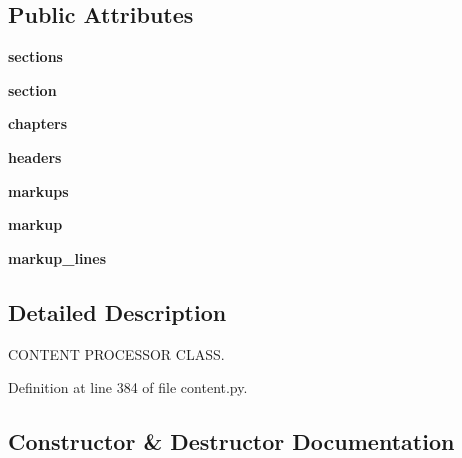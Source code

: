 \subsection*{Public Attributes}
\begin{DoxyCompactItemize}
\item 
\mbox{\label{classcontent_1_1_content_processor_a3ff8c0a86abd7fb9976ae174a7d785f3}} 
{\bfseries sections}
\item 
\mbox{\label{classcontent_1_1_content_processor_a2021840f8ca8c604745a92876a10b027}} 
{\bfseries section}
\item 
\mbox{\label{classcontent_1_1_content_processor_af0f3d9aa503065b3ab016f53d2bad324}} 
{\bfseries chapters}
\item 
\mbox{\label{classcontent_1_1_content_processor_af9febff3c480e3ea067ad35e04f10795}} 
{\bfseries headers}
\item 
\mbox{\label{classcontent_1_1_content_processor_ad9d5d547deff99b362572d8e7029cf96}} 
{\bfseries markups}
\item 
\mbox{\label{classcontent_1_1_content_processor_a4f0dc56a50679457ab079cec4f98a6ef}} 
{\bfseries markup}
\item 
\mbox{\label{classcontent_1_1_content_processor_a08b63a235351bdc84a1a12d565d498c9}} 
{\bfseries markup\+\_\+lines}
\end{DoxyCompactItemize}


\subsection{Detailed Description}
C\+O\+N\+T\+E\+NT P\+R\+O\+C\+E\+S\+S\+OR C\+L\+A\+SS. 

Definition at line 384 of file content.\+py.



\subsection{Constructor \& Destructor Documentation}
\mbox{\label{classcontent_1_1_content_processor_ab89414a8a63232189c5433fcd450a030}} 
